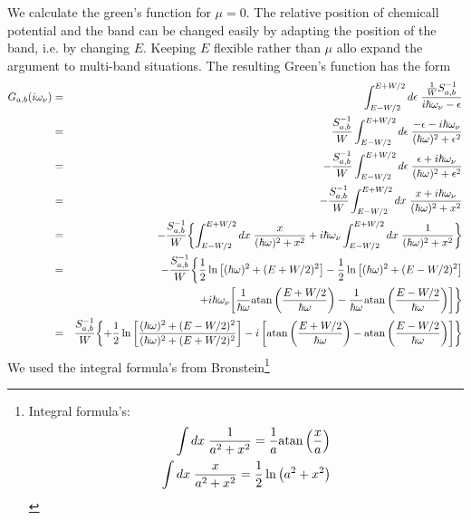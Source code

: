 \documentclass[11pt,a4paper]{report}
\begin{document}
We calculate the green's function for $\mu=0$. The relative position
of chemicall potential and the band can be changed easily by adapting
the position of the band, i.e. by changing $E$. Keeping $E$ flexible
rather than $\mu$ allo expand the argument to multi-band situations.
The resulting Green's function has the form
\begin{eqnarray}
G_{a,b}(i\omega_\nu)&=&\int_{E-W/2}^{E+W/2} d\epsilon\;
\frac{\frac{1}{W}S^{-1}_{a,b}}{i\hbar\omega_\nu-\epsilon}
\nonumber\\
&=&
\frac{S^{-1}_{a,b}}{W}\int_{E-W/2}^{E+W/2}d\epsilon\;
\frac{-\epsilon-i\hbar\omega_\nu}{(\hbar\omega)^2+\epsilon^2}
\nonumber\\
&=&
-\frac{S^{-1}_{a,b}}{W}\int_{E-W/2}^{E+W/2}d\epsilon\;
\frac{\epsilon+i\hbar\omega_\nu}{(\hbar\omega)^2+\epsilon^2}
\nonumber\\
&=&
-\frac{S^{-1}_{a,b}}{W}\int_{E-W/2}^{E+W/2}dx\;
\frac{x+i\hbar\omega_\nu}{(\hbar\omega)^2+x^2}
\nonumber\\
&=&
-\frac{S^{-1}_{a,b}}{W}
\biggl\lbrace
\int_{E-W/2}^{E+W/2}dx\;
\frac{x}{(\hbar\omega)^2+x^2}
+i\hbar\omega_\nu\int_{E-W/2}^{E+W/2}dx\;
\frac{1}{(\hbar\omega)^2+x^2}
\biggr\rbrace
\nonumber\\
&=&
-\frac{S^{-1}_{a,b}}{W}
\biggl\lbrace
\frac{1}{2}\ln\left[(\hbar\omega)^2+(E+W/2)^2\right]
-\frac{1}{2}\ln\left[(\hbar\omega)^2+(E-W/2)^2\right]
\nonumber\\
&&\hspace{1cm}
 +i\hbar\omega_\nu 
\biggl[
 \frac{1}{\hbar\omega}{\rm atan}\left(\frac{E+W/2}{\hbar\omega}\right)
-\frac{1}{\hbar\omega}{\rm atan}\left(\frac{E-W/2}{\hbar\omega}\right)
\biggr]
\biggr\rbrace
\nonumber\\
&=&
\frac{S^{-1}_{a,b}}{W}
\biggl\lbrace
+\frac{1}{2}\ln\left[
\frac{(\hbar\omega)^2+(E-W/2)^2}{(\hbar\omega)^2+(E+W/2)^2}
\right]
-i \left[{\rm atan}\left(\frac{E+W/2}{\hbar\omega}\right)
-{\rm atan}\left(\frac{E-W/2}{\hbar\omega}\right)\right]
\biggr\rbrace
\nonumber\\
\end{eqnarray}
We used the integral formula's from Bronstein\footnote{Integral formula's:
\begin{eqnarray}
\int dx\;\frac{1}{a^2+x^2}=\frac{1}{a}{\rm atan}\left(\frac{x}{a}\right)
\nonumber\\
\int dx\;\frac{x}{a^2+x^2}=\frac{1}{2}\ln\left(a^2+x^2\right)
\end{eqnarray}
}
\end{document}
